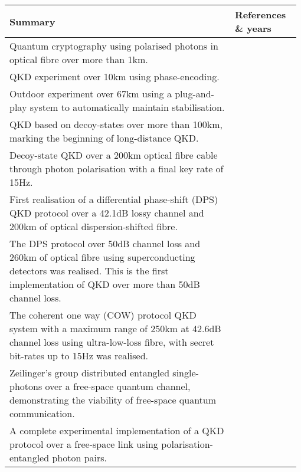 \begin{table*}[!htbp]
\begin{tabular}{|p{0.755\linewidth}|p{0.22\linewidth}|}
	\hline
	\textbf{Summary} & \textbf{References \& years} \\	\hline \hline
	Quantum cryptography using polarised photons in optical fibre over more than 1km. & \cite{bib:EL_23_383} \\
	\hline
	QKD experiment over 10km using phase-encoding. & \cite{bib:EL_29_634} \\
	\hline
	Outdoor experiment over 67km using a plug-and-play system to automatically maintain stabilisation. & \cite{bib:Arx0203118} \\
	\hline
	QKD based on decoy-states over more than 100km, marking the beginning of long-distance QKD. & \cite{bib:PRL_98_010505, bib:PRL_98_010504, bib:rosenberg2007long} \\
	\hline
	Decoy-state QKD over a 200km optical fibre cable through photon polarisation with a final key rate of 15Hz. & \cite{bib:OptExp_18_8587} \\
	\hline
	First realisation of a differential phase-shift (DPS) QKD protocol over a 42.1dB lossy channel and 200km of optical dispersion-shifted fibre. & \cite{bib:NP_1_343} \\
	\hline
	The DPS protocol over 50dB channel loss and 260km of optical fibre using superconducting detectors was realised. This is the first implementation of QKD over more than 50dB channel loss.&\cite{bib:OL_37_1008}\\
	\hline
	The coherent one way (COW) protocol QKD system with a maximum range of 250km at 42.6dB channel loss using ultra-low-loss fibre, with secret bit-rates up to 15Hz was realised. & \cite{bib:NJP_11_075003}\\
	\hline
	Zeilinger's group distributed entangled single-photons over a free-space quantum channel, demonstrating the viability of free-space quantum communication. & \cite{bib:OE_13_202}\\
	\hline
	A complete experimental implementation of a QKD protocol over a free-space link using polarisation-entangled photon pairs. & \cite{bib:APL_89_101122}\\

\end{tabular}
\end{table*}

